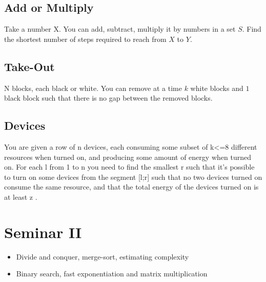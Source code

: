 \documentclass{llncs}
\begin{document}
\subsection{Add or Multiply}

Take a number X. You can add, subtract, multiply it by numbers in a set $S$. Find the shortest number of steps required to reach from $X$ to $Y$.

\subsection{Take-Out \cite{website:edu-pl:take-out}}

N blocks, each black or white. You can remove at a time $k$ white blocks and $1$ black block such that there is no gap between the removed blocks.
\subsection{Devices}
	You are given a row of n devices, each consuming some subset of k<=8 different resources when turned on, and producing some amount of energy when turned on. For each l from 1 to n you need to find the smallest r such that it's possible to turn on some devices from the segment [l;r] such that no two devices turned on consume the same resource, and that the total energy of the devices turned on is at least z \cite{website:petr1}.

\section{Seminar II}
\label{sec:seminar2}

\begin{itemize}
	\item Divide and conquer, merge-sort, estimating complexity
	\item Binary search, fast exponentiation and matrix multiplication
\end{itemize}

%
%
%
\clearpage


\end{document}
